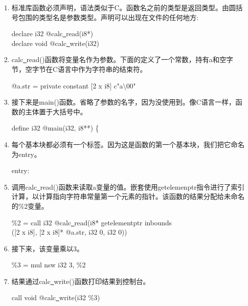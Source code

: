 \begin{enumerate}
\item 标准库函数必须声明，语法类似于C。函数名之前的类型是返回类型。由圆括号包围的类型名是参数类型。声明可以出现在文件的任何地方:
\begin{tcolorbox}[colback=white,colframe=black]
declare i32 @calc\underline{~}read(i8*) \\
declare void @calc\underline{~}write(i32)
\end{tcolorbox}

\item calc\underline{~}read()函数将变量名作为参数。下面的定义了一个常数，持有a和空字节，空字节在C语言中作为字符串的结束符。
\begin{tcolorbox}[colback=white,colframe=black]
@a.str = private constant [2 x i8] c"a$\setminus$00"
\end{tcolorbox}

\item 接下来是main()函数。省略了参数的名字，因为没使用到。像C语言一样，函数的主体置于大括号中。
\begin{tcolorbox}[colback=white,colframe=black]
define i32 @main(i32, i8**) \{
\end{tcolorbox}

\item 每个基本块都必须有一个标签。因为这是函数的第一个基本块，我们把它命名为entry。
\begin{tcolorbox}[colback=white,colframe=black]
entry:
\end{tcolorbox}

\item 调用calc\underline{~}read()函数来读取a变量的值。嵌套使用getelemenptr指令进行了索引计算，以计算指向字符串常量第一个元素的指针。该函数的结果分配给未命名的\%2变量。
\begin{tcolorbox}[colback=white,colframe=black]
\hspace*{1cm}\%2 = call i32 @calc\underline{~}read(i8* getelementptr inbounds \\
\hspace*{3.5cm}([2 x i8], [2 x i8]* @a.str, i32 0, i32
0))
\end{tcolorbox}

\item 接下来，该变量乘以3。
\begin{tcolorbox}[colback=white,colframe=black]
\hspace*{1cm}\%3 = mul nsw i32 3, \%2
\end{tcolorbox}

\item 结果通过calc\underline{~}write()函数打印结果到控制台。
\begin{tcolorbox}[colback=white,colframe=black]
	\hspace*{1cm}call void @calc\underline{~}write(i32 \%3)
\end{tcolorbox}


\end{enumerate}
